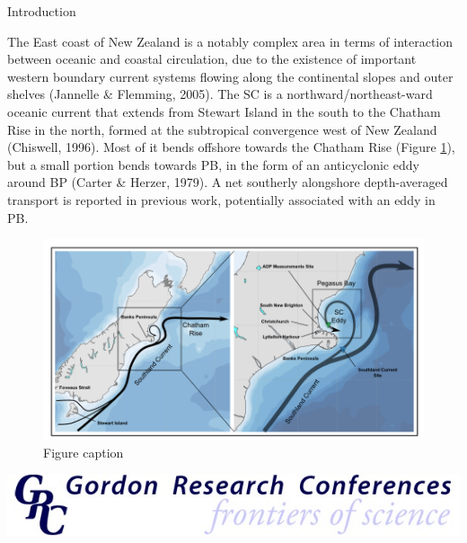 \documentclass[final]{beamer}
\newlength{\onecolwid}
\begin{document}
\begin{frame}[t]
\begin{columns}[t]
\begin{column}{\onecolwid}
    \begin{block}{Introduction}

    The East coast of New Zealand is a notably complex area in terms of interaction between oceanic and coastal circulation, due to the existence of important western boundary current systems flowing along the continental slopes and outer shelves (Jannelle \& Flemming, 2005). The SC is a northward/northeast-ward oceanic current that extends from Stewart Island in the south to the Chatham Rise in the north, formed at the subtropical convergence west of New Zealand (Chiswell, 1996). Most of it bends offshore towards the Chatham Rise (Figure \ref{schematics}), but a small portion bends towards PB, in the form of an anticyclonic eddy around BP (Carter \& Herzer, 1979). A net southerly alongshore depth-averaged transport is reported in previous work, potentially associated with an eddy in PB. 
    \begin{figure}
    \includegraphics[width=1.0\linewidth]{schematics.png}
    \caption{\label{schematics} Figure caption}
    \end{figure}


    \end{block}


    \includegraphics[width=1.0\linewidth]{GordonCRC.jpg}



\end{column} %


\end{columns}
\end{frame}
\end{document}
